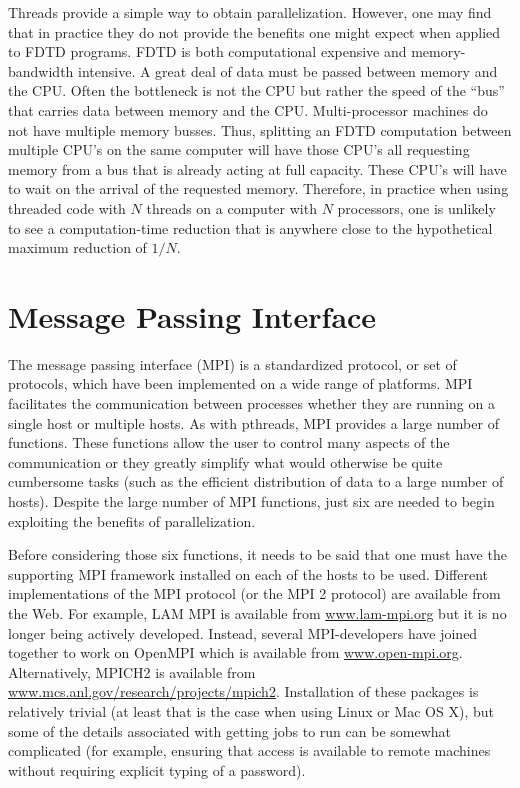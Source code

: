 Threads provide a simple way to obtain parallelization.  However, one
may find that in practice they do not provide the benefits one might
expect when applied to FDTD programs.  FDTD is both computational
expensive and memory-bandwidth intensive.  A great deal of data must
be passed between memory and the CPU.  Often the bottleneck is not the
CPU but rather the speed of the ``bus'' that carries data between
memory and the CPU.  Multi-processor machines do not have multiple
memory busses.  Thus, splitting an FDTD computation between multiple
CPU's on the same computer will have those CPU's all requesting memory
from a bus that is already acting at full capacity.  These CPU's will
have to wait on the arrival of the requested memory.  Therefore, in
practice when using threaded code with $N$ threads on a computer with
$N$ processors, one is unlikely to see a computation-time reduction
that is anywhere close to the hypothetical maximum reduction of $1/N$.

\section{Message Passing Interface}

The message passing interface (MPI) is a standardized protocol, or set
of protocols, which have been implemented on a wide range of
platforms.  MPI facilitates the communication between processes
whether they are running on a single host or multiple hosts.  As with
pthreads, MPI provides a large number of functions.  These functions
allow the user to control many aspects of the communication or they
greatly simplify what would otherwise be quite cumbersome tasks (such
as the efficient distribution of data to a large number of hosts).
Despite the large number of MPI functions, just six are needed to
begin exploiting the benefits of parallelization.

Before considering those six functions, it needs to be said that one
must have the supporting MPI framework installed on each of the hosts
to be used.  Different implementations of the MPI protocol (or the MPI
2 protocol) are available from the Web.  For example, LAM MPI is
available from \url{www.lam-mpi.org} but it is no longer being
actively developed.  Instead, several MPI-developers have joined
together to work on OpenMPI which is available from
\url{www.open-mpi.org}.  Alternatively, MPICH2 is available from
\url{www.mcs.anl.gov/research/projects/mpich2}.  Installation of these
packages is relatively trivial (at least that is the case when using
Linux or Mac OS X), but some of the details associated with getting
jobs to run can be somewhat complicated (for example, ensuring that
access is available to remote machines without requiring explicit
typing of a password).

